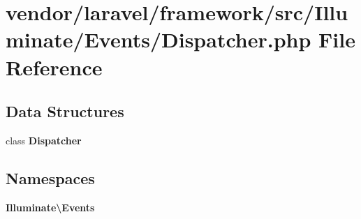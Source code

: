 \section{vendor/laravel/framework/src/\+Illuminate/\+Events/\+Dispatcher.php File Reference}
\label{_events_2_dispatcher_8php}
\subsection*{Data Structures}
\begin{DoxyCompactItemize}
\item 
class {\bf Dispatcher}
\end{DoxyCompactItemize}
\subsection*{Namespaces}
\begin{DoxyCompactItemize}
\item 
 {\bf Illuminate\textbackslash{}\+Events}
\end{DoxyCompactItemize}
